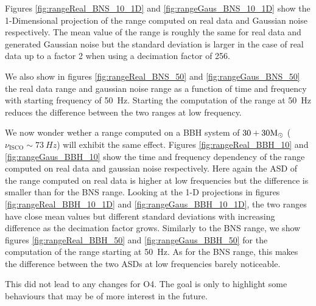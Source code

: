 Figures \ref{fig:rangeReal_BNS_10_1D} and \ref{fig:rangeGaus_BNS_10_1D} show the 1-Dimensional projection of the range computed on real data and Gaussian noise respectively.
The mean value of the range is roughly the same for real data and generated Gaussian noise but the standard deviation is larger in the case of real data up to a factor 2 when using a decimation factor of 256.
 
We also show in figures \ref{fig:rangeReal_BNS_50} and \ref{fig:rangeGaus_BNS_50} the real data range and gaussian noise range as a function of time and frequency with starting frequency of \SI{50}{Hz}.
Starting the computation of the range at \SI{50}{Hz} reduces the difference between the two ranges at low frequency.
 
We now wonder wether a range computed on a BBH system of $30+30\textrm{M$_{\odot}$}$ ($\nu_{\text{ISCO}} \sim \SI{73}{Hz}$) will exhibit the same effect.
Figures \ref{fig:rangeReal_BBH_10} and \ref{fig:rangeGaus_BBH_10} show the time and frequency dependency of the range computed on real data and gaussian noise respectively.
Here again the ASD of the range computed on real data is higher at low frequencies but the difference is smaller than for the BNS range.
Looking at the 1-D projections in figures \ref{fig:rangeReal_BBH_10_1D} and \ref{fig:rangeGaus_BBH_10_1D}, the two ranges have close mean values but different standard deviations with increasing difference as the decimation factor grows.
Similarly to the BNS range, we show figures \ref{fig:rangeReal_BBH_50} and \ref{fig:rangeGaus_BBH_50} for the computation of the range starting at \SI{50}{Hz}.
As for the BNS range, this makes the difference between the two ASDs at low frequencies barely noticeable.  
  
This did not lead to any changes for O4.
The goal is only to highlight some behaviours that may be of more interest in the future.





